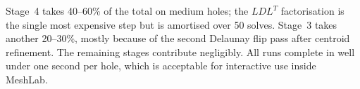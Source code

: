 Stage~4 takes 40--60\% of the total on medium holes; the $LDL^T$ factorisation is the single most expensive step but is amortised over 50 solves. Stage~3 takes another 20--30\%, mostly because of the second Delaunay flip pass after centroid refinement. The remaining stages contribute negligibly. All runs complete in well under one second per hole, which is acceptable for interactive use inside MeshLab.
